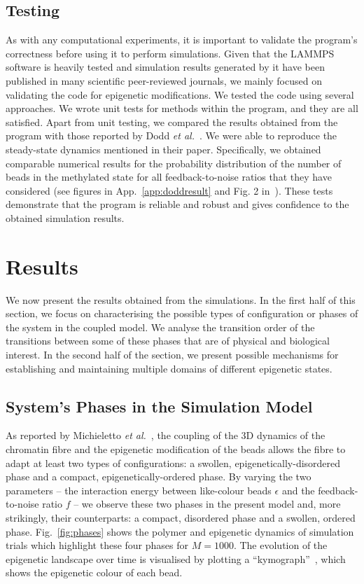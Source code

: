 \documentclass[12pt]{article}
\newcommand{\etal}{\emph{et al.}}
\begin{document}
\FloatBarrier
\subsection{Testing}
As with any computational experiments, it is important to validate the program's correctness before using it to perform simulations. Given that the LAMMPS software is heavily tested and simulation results generated by it have been published in many scientific peer-reviewed journals, we mainly focused on validating the code for epigenetic modifications. We tested the code using several approaches. We wrote unit tests for methods within the program, and they are all satisfied. Apart from unit testing, we compared the results obtained from the program with those reported by Dodd \etal~\cite{dodd2007}. We were able to reproduce the steady-state dynamics mentioned in their paper. Specifically, we obtained comparable numerical results for the probability distribution of the number of beads in the methylated state for all feedback-to-noise ratios that they have considered (see figures in App.~\ref{app:doddresult} and Fig. 2 in~\cite{dodd2007}). These tests demonstrate that the program is reliable and robust and gives confidence to the obtained simulation results. 

\pagebreak
\section{Results}
We now present the results obtained from the simulations. In the first half of this section, we focus on characterising the possible types of configuration or phases of the system in the coupled model. We analyse the transition order of the transitions between some of these phases that are of physical and biological interest. In the second half of the section, we present possible mechanisms for establishing and maintaining multiple domains of different epigenetic states.

\subsection{System's Phases in the Simulation Model}
As reported by Michieletto \etal~\cite{michieletto2016}, the coupling of the 3D dynamics of the chromatin fibre and the epigenetic modification of the beads allows the fibre to adapt at least two types of configurations: a swollen, epigenetically-disordered phase and a compact, epigenetically-ordered phase. By varying the two parameters -- the interaction energy between like-colour beads $\epsilon$ and the feedback-to-noise ratio $f$ -- we observe these two phases in the present model and, more strikingly, their counterparts: a compact, disordered phase and a swollen, ordered phase. Fig.~\ref{fig:phases} shows the polymer and epigenetic dynamics of simulation trials which highlight these four phases for $M = 1000$. The evolution of the epigenetic landscape over time is visualised by plotting a ``kymograph''~\cite{michieletto2016,brumley2014}, which shows the epigenetic colour of each bead. 
\end{document}

